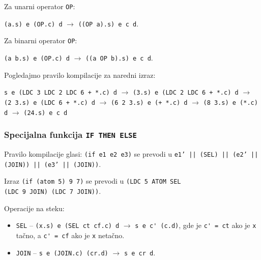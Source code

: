 \noindent Za unarni operator \verb|OP|:
\begin{center}
	\verb|(a.s) e (OP.c) d| $\rightarrow$ \verb|((OP a).s) e c d|.
\end{center}

\noindent Za binarni operator \verb|OP|:
\begin{center}
	\verb|(a b.s) e (OP.c) d| $\rightarrow$ \verb|((a OP b).s) e c d|.
\end{center}

\begin{primer} Pogledajmo pravilo kompilacije za naredni izraz:
	\begin{center}
		\verb|s e (LDC 3 LDC 2 LDC 6 + *.c) d|
		$\rightarrow$ \verb|(3.s) e (LDC 2 LDC 6 + *.c) d|
		$\rightarrow$ \verb|(2 3.s) e (LDC 6 + *.c) d|
		$\rightarrow$ \verb|(6 2 3.s) e (+ *.c) d|
		$\rightarrow$ \verb|(8 3.s) e (*.c) d|
		$\rightarrow$ \verb|(24.s) e c d|
	\end{center}
\end{primer}

\subsubsection{Specijalna funkcija {\tt IF THEN ELSE}}

Pravilo kompilacije glasi: \verb|(if e1 e2 e3)| se prevodi u
\texttt{e1' || (SEL) || (e2' || (JOIN)) || (e3' || (JOIN))}.

\begin{primer}
	Izraz \verb|(if (atom 5) 9 7)| se prevodi u \verb|(LDC 5 ATOM SEL|\\
	\verb|(LDC 9 JOIN) (LDC 7 JOIN))|.
\end{primer}

Operacije na steku:
\begin{itemize}
	\item \verb|SEL| -- \verb|(x.s) e (SEL ct cf.c) d| $\rightarrow$ \verb|s e c' (c.d)|, gde je \verb|c' = ct| ako je \verb|x| tačno, a \verb|c' = cf| ako je \verb|x| netačno.
	
	\item \verb|JOIN| -- \verb|s e (JOIN.c) (cr.d)| $\rightarrow$ \verb|s e cr d|.\\
\end{itemize}


